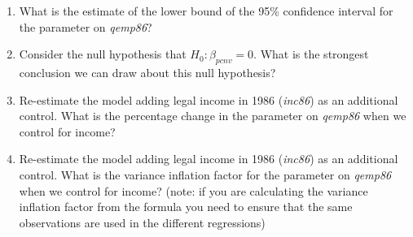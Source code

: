 \begin{enumerate}
\item What is the estimate of the lower bound of the 95\% confidence interval for the parameter on \textit{qemp86}?

\item Consider the null hypothesis that $H_0:\beta_{pcnv}=0$. What is the strongest conclusion we can draw about this null hypothesis?

\item Re-estimate the model adding legal income in 1986 (\textit{inc86}) as an additional control. What is the percentage change in the parameter on \textit{qemp86} when we control for income?

\item Re-estimate the model adding legal income in 1986 (\textit{inc86}) as an additional control. What is the variance inflation factor for the parameter on \textit{qemp86} when we control for income? (note: if you are calculating the variance inflation factor from the formula you need to ensure that the same observations are used in the different regressions)
\end{enumerate}

